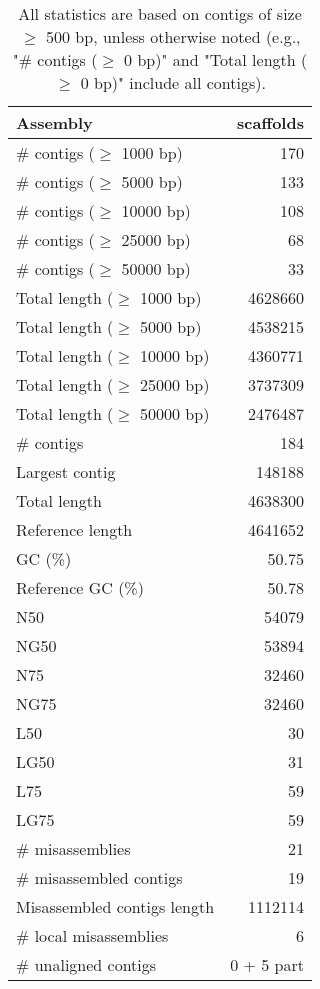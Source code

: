 \documentclass[12pt,a4paper]{article}
\begin{document}
\begin{table}[ht]
\begin{center}
\caption{All statistics are based on contigs of size $\geq$ 500 bp, unless otherwise noted (e.g., "\# contigs ($\geq$ 0 bp)" and "Total length ($\geq$ 0 bp)" include all contigs).}
\begin{tabular}{|l*{1}{|r}|}
\hline
Assembly & scaffolds \\ \hline
\# contigs ($\geq$ 1000 bp) & 170 \\ \hline
\# contigs ($\geq$ 5000 bp) & 133 \\ \hline
\# contigs ($\geq$ 10000 bp) & 108 \\ \hline
\# contigs ($\geq$ 25000 bp) & 68 \\ \hline
\# contigs ($\geq$ 50000 bp) & 33 \\ \hline
Total length ($\geq$ 1000 bp) & 4628660 \\ \hline
Total length ($\geq$ 5000 bp) & 4538215 \\ \hline
Total length ($\geq$ 10000 bp) & 4360771 \\ \hline
Total length ($\geq$ 25000 bp) & 3737309 \\ \hline
Total length ($\geq$ 50000 bp) & 2476487 \\ \hline
\# contigs & 184 \\ \hline
Largest contig & 148188 \\ \hline
Total length & 4638300 \\ \hline
Reference length & 4641652 \\ \hline
GC (\%) & 50.75 \\ \hline
Reference GC (\%) & 50.78 \\ \hline
N50 & 54079 \\ \hline
NG50 & 53894 \\ \hline
N75 & 32460 \\ \hline
NG75 & 32460 \\ \hline
L50 & 30 \\ \hline
LG50 & 31 \\ \hline
L75 & 59 \\ \hline
LG75 & 59 \\ \hline
\# misassemblies & 21 \\ \hline
\# misassembled contigs & 19 \\ \hline
Misassembled contigs length & 1112114 \\ \hline
\# local misassemblies & 6 \\ \hline
\# unaligned contigs & 0 + 5 part \\ \hline

\end{tabular}
\end{center}
\end{table}
\end{document}
